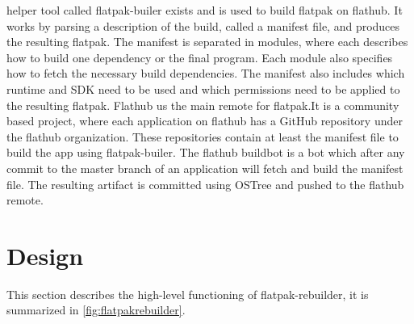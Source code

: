 \documentclass[a4paper,11pt,oneside]{report}
\theoremstyle{definition}
\newcommand{\sysname}{flatpak-rebuilder\xspace}
\newcommand{\fp}{flatpak\xspace}
\newcommand{\fh}{flathub\xspace}
\newcommand{\fb}{flatpak-builer\xspace}
\newcommand{\fhbb}{flathub buildbot\xspace}
\newcommand{\ot}{OSTree\xspace}
\begin{document}
helper tool called \fb exists and is used to build \fp on \fh. It works by
parsing a description of the build, called a manifest file, and produces the
resulting \fp. The manifest is separated in modules, where each describes how
to build one dependency or the final program. Each module also specifies how to
fetch the necessary build dependencies. The manifest also includes which
runtime and SDK need to be used and which permissions need to be applied to the
resulting \fp. 
Flathub us the main remote for \fp.It is a community based project, where each
application on \fh has a GitHub repository under the \fh organization. These
repositories contain at least the manifest file to build the app using \fb. The
\fhbb is a bot which after any commit to the master branch of an application
will fetch and build the manifest file. The resulting artifact is committed
using \ot and pushed to the \fh remote.


\chapter{Design}
\label{chap:design}

This section describes the high-level functioning of \sysname, it is summarized
in \autoref{fig:flatpakrebuilder}.
\end{document}
